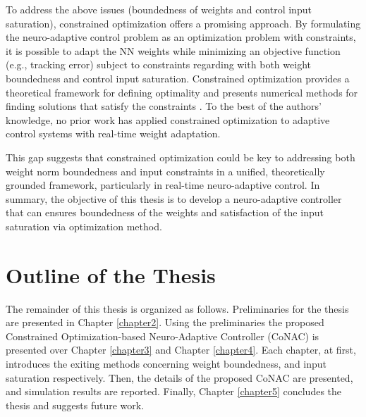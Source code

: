 To address the above issues (boundedness of weights and control input saturation), constrained optimization offers a promising approach. 
By formulating the neuro-adaptive control problem as an optimization problem with constraints, it is possible to adapt the NN weights while minimizing an objective function (e.g., tracking error) subject to constraints regarding with both weight boundedness and control input saturation. 
Constrained optimization provides a theoretical framework for defining optimality and presents numerical methods for finding solutions that satisfy the constraints \cite{RN9}.
To the best of the authors’ knowledge, no prior work has applied constrained optimization to adaptive control systems with real-time weight adaptation.

This gap suggests that constrained optimization could be
key to addressing both weight norm boundedness and input
constraints in a unified, theoretically grounded framework,
particularly in real-time neuro-adaptive control.
In summary, the objective of this thesis is to develop a neuro-adaptive controller that can ensures boundedness of the weights and satisfaction of the input saturation via optimization method.

\section{Outline of the Thesis} 

The remainder of this thesis is organized as follows. 
Preliminaries for the thesis are presented in Chapter \ref{chapter2}.
Using the preliminaries the proposed Constrained Optimization-based Neuro-Adaptive Controller (CoNAC) is presented over Chapter \ref{chapter3} and Chapter \ref{chapter4}.
Each chapter, at first, introduces the exiting methods concerning weight boundedness, and input saturation respectively.
Then, the details of the proposed CoNAC are presented, and simulation results are reported.
Finally, Chapter \ref{chapter5} concludes the thesis and suggests future work.
